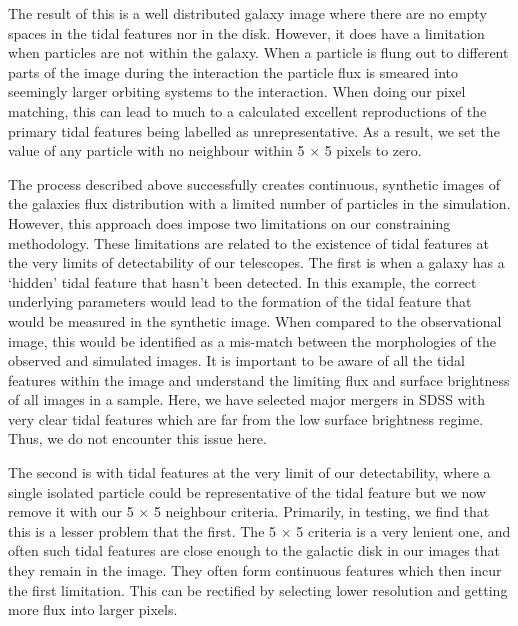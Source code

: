 The result of this is a well distributed galaxy image where there are no empty spaces in the tidal features nor in the disk. However, it does have a limitation when particles are not within the galaxy. When a particle is flung out to different parts of the image during the interaction the particle flux is smeared into seemingly larger orbiting systems to the interaction. When doing our pixel matching, this can lead to much to a calculated excellent reproductions of the primary tidal features being labelled as unrepresentative. As a result, we set the value of any particle with no neighbour within 5 $\times$ 5 pixels to zero. 

The process described above successfully creates continuous, synthetic images of the galaxies flux distribution with a limited number of particles in the simulation. However, this approach does impose two limitations on our constraining methodology. These limitations are related to the existence of tidal features at the very limits of detectability of our telescopes. The first is when a galaxy has a `hidden' tidal feature that hasn't been detected. In this example, the correct underlying parameters would lead to the formation of the tidal feature that would be measured in the synthetic image. When compared to the observational image, this would be identified as a mis-match between the morphologies of the observed and simulated images. It is important to be aware of all the tidal features within the image and understand the limiting flux and surface brightness of all images in a sample. Here, we have selected major mergers in SDSS with very clear tidal features which are far from the low surface brightness regime. Thus, we do not encounter this issue here.

The second is with tidal features at the very limit of our detectability, where a single isolated particle could be representative of the tidal feature but we now remove it with our 5 $\times$ 5 neighbour criteria. Primarily, in testing, we find that this is a lesser problem that the first. The 5 $\times$ 5 criteria is a very lenient one, and often such tidal features are close enough to the galactic disk in our images that they remain in the image. They often form continuous features which then incur the first limitation. This can be rectified by selecting lower resolution and getting more flux into larger pixels.

